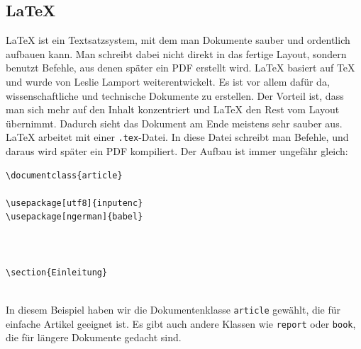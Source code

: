 \subsection{LaTeX}

LaTeX ist ein Textsatzsystem, mit dem man Dokumente sauber und ordentlich aufbauen kann. Man schreibt dabei nicht direkt in das fertige Layout, sondern benutzt Befehle, aus denen später ein PDF erstellt wird.
LaTeX basiert auf TeX und wurde von Leslie Lamport weiterentwickelt. Es ist vor allem dafür da, wissenschaftliche und technische Dokumente zu erstellen.
Der Vorteil ist, dass man sich mehr auf den Inhalt konzentriert und LaTeX den Rest vom Layout übernimmt. Dadurch sieht das Dokument am Ende meistens sehr sauber aus.
LaTeX arbeitet mit einer \texttt{.tex}-Datei. In diese Datei schreibt man Befehle, und daraus wird später ein PDF kompiliert.
Der Aufbau ist immer ungefähr gleich:

\begin{verbatim}
\documentclass{article}

\usepackage[utf8]{inputenc}
\usepackage[ngerman]{babel}



\section{Einleitung}


\end{verbatim}
In diesem Beispiel haben wir die Dokumentenklasse \texttt{article} gewählt, die für einfache Artikel geeignet ist. Es gibt auch andere Klassen wie \texttt{report} oder \texttt{book}, die für längere Dokumente gedacht sind.
